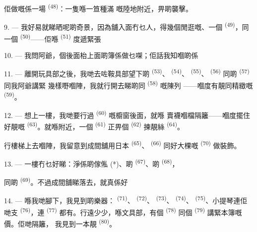 佢做嘅係一場 \textsuperscript{(48)}：一隻喺一笪種滿
嘅陸地附近，畀啲襲擊。

9. --- 我好易就睇晒呢啲奇景，因為舖入面冇乜人，得幾個閒逛嘅、一個
 \textsuperscript{(49)}，同一個 \textsuperscript{(50)}——佢喺
 \textsuperscript{(51)} 度遞緊張

10. --- 我問阿爺，個後面枱上面啲簿係做乜㗎；佢話我知嗰啲係

\VUsaut{3.6mm}
\VUsaut{2.8mm}

11. --- 離開玩具部之後，我哋去咗鞍具部望下啲 \textsuperscript{(53)}、
 \textsuperscript{(54)}、 \textsuperscript{(55)}、
\textsuperscript{(56)} 同啲 \textsuperscript{(57)} 同我阿爺講緊
幾樣嘢嗰陣，我就行開去睇啲同 \textsuperscript{(58)} 嘅陳列
——嗰度有靚同精緻嘅 \textsuperscript{(59)}。

12. --- 想上一樓，我哋要行過 \textsuperscript{(60)} 嘅櫥窗後面，就喺
賣襪嗰檔隔籬——嗰度擺住好靚嘅 \textsuperscript{(63)}。就喺附近，一個
 \textsuperscript{(61)} 正畀個 \textsuperscript{(62)} 揀靚絲
 \textsuperscript{(64)}。

行樓梯上去嗰陣，我留意到成間舖用日本 \textsuperscript{(65)}、
 \textsuperscript{(66)} 同好大棵嘅 \textsuperscript{(70)} 做裝飾。

13. --- 一樓冇乜好睇：淨係啲傢俬 (*)、啲 \textsuperscript{(67)}、啲
 \textsuperscript{(68)}，

同啲 \textsuperscript{(69)}。不過成間舖睇落去，就真係好

14. --- 喺我哋腳下，我見到啲樂器： \textsuperscript{(71)}、
\textsuperscript{(72)}、 \textsuperscript{(73)}、 \textsuperscript{(74)}、
 \textsuperscript{(75)}、小提琴連佢哋支 \textsuperscript{(76)}，連
 \textsuperscript{(77)} 都有。行遠少少，喺文具部，有個
\textsuperscript{(78)} 同個 \textsuperscript{(79)} 講緊本簿嘅價。佢哋隔籬，
我見到一本靚 \textsuperscript{(80)}。

